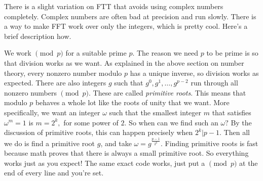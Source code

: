 There is a slight variation on FTT that avoids using complex numbers completely. Complex numbers are often bad at precision and run slowly. There is a way to make FFT work over only the integers, which is pretty cool. Here's a brief description how.

We work $\pmod{p}$ for a suitable prime $p$. The reason we need $p$ to be prime is so that division works as we want. As explained in the above section on number theory, every nonzero number modulo $p$ has a unique inverse, so division works as expected. There are also integers $g$ such that $g^0, g^1, \dots, g^{p-2}$ run through all nonzero numbers $\pmod{p}.$ These are called \emph{primitive roots}. This means that modulo $p$ behaves a whole lot like the roots of unity that we want. More specifically, we want an integer $\omega$ such that the smallest integer $m$ that satisfies $\omega^m = 1$ is $m = 2^k,$ for some power of $2.$ So when can we find such an $\omega?$ By the discussion of primitive roots, this can happen precisely when $2^k | p-1.$ Then all we do is find a primitive root $g$, and take $\omega = g^{\frac{p-1}{2^k}}.$ Finding primitive roots is fast because math proves that there is always a small primitive root. So everything works just as you expect! The same exact code works, just put a $\pmod{p}$ at the end of every line and you're set.